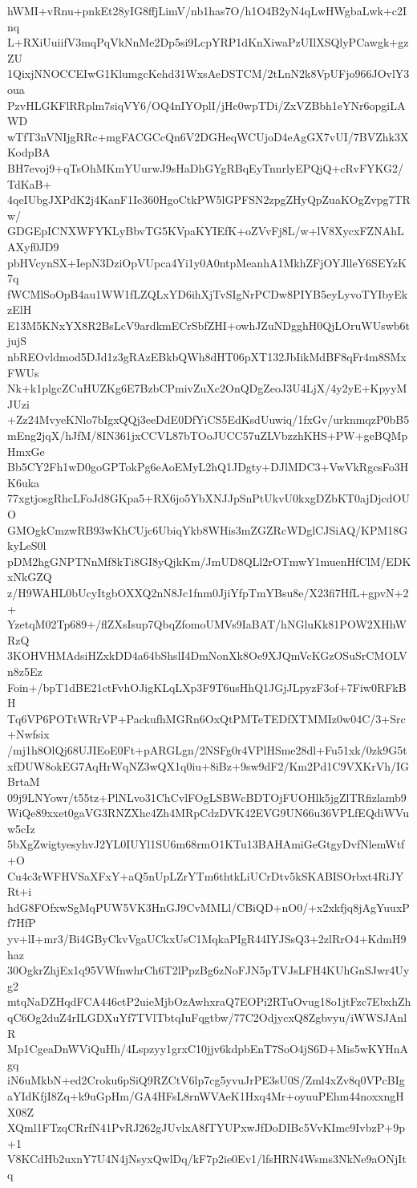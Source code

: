 hWMI+vRnu+pnkEt28yIG8ffjLimV/nb1has7O/h1O4B2yN4qLwHWgbaLwk+c2Inq
L+RXiUuiifV3mqPqVkNnMe2Dp5si9LcpYRP1dKnXiwaPzUIlXSQlyPCawgk+gzZU
1QixjNNOCCEIwG1KlumgcKehd31WxsAeDSTCM/2tLnN2k8VpUFjo966JOvlY3oua
PzvHLGKFlRRplm7siqVY6/OQ4nIYOplI/jHc0wpTDi/ZxVZBbh1eYNr6opgiLAWD
wTfT3nVNIjgRRc+mgFACGCcQn6V2DGHeqWCUjoD4eAgGX7vUI/7BVZhk3XKodpBA
BH7evoj9+qTsOhMKmYUurwJ9sHaDhGYgRBqEyTnnrlyEPQjQ+cRvFYKG2/TdKaB+
4qeIUbgJXPdK2j4KanF1Ie360HgoCtkPW5lGPFSN2zpgZHyQpZuaKOgZvpg7TRw/
GDGEpICNXWFYKLyBbvTG5KVpaKYIEfK+oZVvFj8L/w+lV8XycxFZNAhLAXyf0JD9
pbHVcynSX+IepN3DziOpVUpca4Yi1y0A0ntpMeanhA1MkhZFjOYJlleY6SEYzK7q
fWCMlSoOpB4au1WW1fLZQLxYD6ihXjTvSIgNrPCDw8PIYB5eyLyvoTYIbyEkzElH
E13M5KNxYX8R2BsLcV9ardkmECrSbfZHI+owhJZuNDgghH0QjLOruWUswb6tjujS
nbREOvldmod5DJd1z3gRAzEBkbQWh8dHT06pXT132JbIikMdBF8qFr4m8SMxFWUs
Nk+k1plgcZCuHUZKg6E7BzbCPmivZuXc2OnQDgZeoJ3U4LjX/4y2yE+KpyyMJUzi
+Zz24MvyeKNlo7bIgxQQj3eeDdE0DfYiCS5EdKsdUuwiq/1fxGv/urknmqzP0bB5
mEng2jqX/hJfM/8IN361jxCCVL87bTOoJUCC57uZLVbzzhKHS+PW+geBQMpHmxGe
Bb5CY2Fh1wD0goGPTokPg6eAoEMyL2hQ1JDgty+DJlMDC3+VwVkRgcsFo3HK6uka
77xgtjosgRhcLFoJd8GKpa5+RX6jo5YbXNJJpSnPtUkvU0kxgDZbKT0ajDjcdOUO
GMOgkCmzwRB93wKhCUjc6UbiqYkb8WHis3mZGZRcWDglCJSiAQ/KPM18GkyLeS0l
pDM2hgGNPTNnMf8kTi8GI8yQjkKm/JmUD8QLl2rOTmwY1muenHfClM/EDKxNkGZQ
z/H9WAHL0bUcyItgbOXXQ2nN8Jc1fnm0JjiYfpTmYBsu8e/X23fi7HfL+gpvN+2+
YzetqM02Tp689+/flZXsIsup7QbqZfomoUMVs9IaBAT/hNGluKk81POW2XHhWRzQ
3KOHVHMAdsiHZxkDD4a64bShslI4DmNonXk8Oe9XJQmVcKGzOSuSrCMOLVn8z5Ez
Foin+/bpT1dBE21ctFvhOJigKLqLXp3F9T6usHhQ1JGjJLpyzF3of+7Fiw0RFkBH
Tq6VP6POTtWRrVP+PackufhMGRn6OxQtPMTeTEDfXTMMIz0w04C/3+Src+Nwfsix
/mj1h8OlQj68UJIEoE0Ft+pARGLgn/2NSFg0r4VPlHSme28dl+Fu51xk/0zk9G5t
xfDUW8okEG7AqHrWqNZ3wQX1q0iu+8iBz+9sw9dF2/Km2Pd1C9VXKrVh/IGBrtaM
09j9LNYowr/t55tz+PlNLvo31ChCvlFOgLSBWcBDTOjFUOHlk5jgZlTRfizlamb9
WiQe89xxet0gaVG3RNZXhc4Zh4MRpCdzDVK42EVG9UN66u36VPLfEQdiWVuw5cIz
5bXgZwigtyesyhvJ2YL0IUYl1SU6m68rmO1KTu13BAHAmiGeGtgyDvfNlemWtf+O
Cu4c3rWFHVSaXFxY+aQ5nUpLZrYTm6thtkLiUCrDtv5kSKABISOrbxt4RiJYRt+i
hdG8FOfxwSgMqPUW5VK3HnGJ9CvMMLl/CBiQD+nO0/+x2xkfjq8jAgYuuxPf7HfP
yv+lI+mr3/Bi4GByCkvVgaUCkxUsC1MqkaPIgR44IYJSsQ3+2zlRrO4+KdmH9haz
30OgkrZhjEx1q95VWfnwhrCh6T2lPpzBg6zNoFJN5pTVJsLFH4KUhGnSJwr4Uyg2
mtqNaDZHqdFCA446ctP2uieMjbOzAwhxraQ7EOPi2RTuOvug18o1jtFzc7EbxhZh
qC6Og2duZ4rILGDXuYf7TVlTbtqIuFqgtbw/77C2OdjycxQ8Zgbvyu/iWWSJAnlR
Mp1CgeaDnWViQuHh/4Lspzyy1grxC10jjv6kdpbEnT7SoO4jS6D+Mis5wKYHnAgq
iN6uMkbN+ed2Croku6pSiQ9RZCtV6lp7cg5yvuJrPE3sU0S/Zml4xZv8q0VPcBIg
aYIdKfjI8Zq+k9uGpHm/GA4HFsL8rnWVAeK1Hxq4Mr+oyuuPEhm44noxxngHX08Z
XQml1FTzqCRrfN41PvRJ262gJUvlxA8fTYUPxwJfDoDIBc5VvKImc9IvbzP+9p+1
V8KCdHb2uxnY7U4N4jNsyxQwlDq/kF7p2ie0Ev1/lfsHRN4Wsms3NkNe9aONjItq
